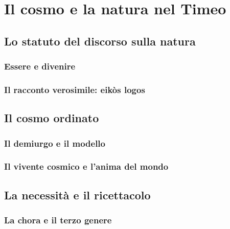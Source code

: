 \chapter{Il cosmo e la natura nel Timeo}
\label{cap:platone:timeo}

\section{Lo statuto del discorso sulla natura}

\subsection{Essere e divenire}

\subsection{Il racconto verosimile: eikòs logos}

\section{Il cosmo ordinato}

\subsection{Il demiurgo e il modello}

\subsection{Il vivente cosmico e l'anima del mondo}

\section{La necessità e il ricettacolo}

\subsection{La chora e il terzo genere}

